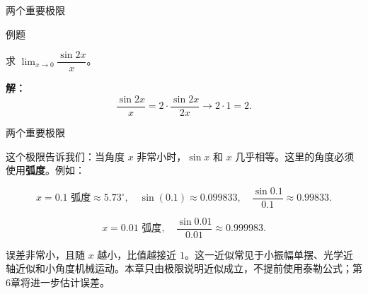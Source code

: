 \documentclass[aspectratio=169,10pt,fontset=fandol]{ctexbeamer}
\begin{document}
\begin{frame}[t,fragile]{两个重要极限}
\normalsize
\begin{block}{例题}
{\normalsize
求 \(\lim_{x \to 0} \dfrac{\sin 2x}{x}\)。


}
\end{block}
\pause
{\normalsize
\textbf{解：}
\[

	\dfrac{\sin 2x}{x} = 2 \cdot \dfrac{\sin 2x}{2x} \to 2 \cdot 1 = 2.

	\]


}
\end{frame}
\begin{frame}[t,fragile]{两个重要极限}
\normalsize
{\normalsize
\begin{application}[物理：小角度近似]



这个极限告诉我们：当角度 \(x\) 非常小时，\(\sin x\) 和 \(x\) 几乎相等。这里的角度必须使用\textbf{弧度}。例如：



\[

x = 0.1 \text{ 弧度} \approx 5.73^\circ,\quad \sin(0.1) \approx 0.099833,\quad \dfrac{\sin 0.1}{0.1} \approx 0.99833.

\]



\[

x = 0.01 \text{ 弧度},\quad \dfrac{\sin 0.01}{0.01} \approx 0.999983.

\]



误差非常小，且随 \(x\) 越小，比值越接近 $1$。这一近似常见于小振幅单摆、光学近轴近似和小角度机械运动。本章只由极限说明近似成立，不提前使用泰勒公式；第6章将进一步估计误差。



\end{application}
}
\end{frame}
\end{document}
